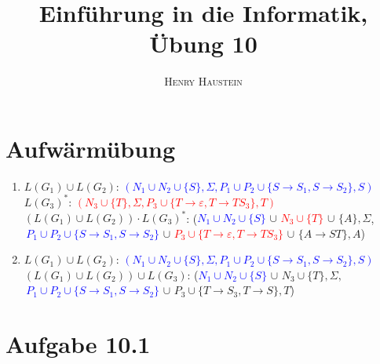 \documentclass{article}
\title{\textbf{Einführung in die Informatik, Übung 10}}
\author{\textsc{Henry Haustein}}
\date{}
\begin{document}
	\maketitle
	
	\section*{Aufwärmübung}
	\begin{enumerate}[label=(\alph*)]
		\item $L(G_1)\cup L(G_2)$: \textcolor{blue}{$(N_1\cup N_2\cup \{S\},\Sigma,P_1\cup P_2\cup \{S\to S_1,S\to S_2\},S)$} \\
		$L(G_3)^\ast$: \textcolor{red}{$(N_3\cup \{T\},\Sigma,P_3\cup \{T\to\varepsilon,T\to TS_3\},T)$} \\
		$(L(G_1)\cup L(G_2))\cdot L(G_3)^\ast$: (\textcolor{blue}{$N_1\cup N_2\cup \{S\}$} $\cup$ \textcolor{red}{$N_3\cup \{T\}$} $\cup \,\,\{A\},\Sigma$,\textcolor{blue}{$\,P_1\cup P_2\cup \{S\to S_1,S\to S_2\}$} $\cup$ \textcolor{red}{$P_3\cup \{T\to\varepsilon,T\to TS_3\}$} $\cup \,\,\{A\to ST\},A$)
		\item $L(G_1)\cup L(G_2)$: \textcolor{blue}{$(N_1\cup N_2\cup \{S\},\Sigma,P_1\cup P_2\cup \{S\to S_1,S\to S_2\},S)$} \\
		$(L(G_1)\cup L(G_2))\cup L(G_3)$: (\textcolor{blue}{$N_1\cup N_2\cup \{S\}$} $\cup \,\,N_3\cup \{T\},\Sigma,$\textcolor{blue}{$\,P_1\cup P_2\cup \{S\to S_1,S\to S_2\}$} $\cup \,\,P_3\cup \{T\to S_3,T\to S\},T$)
	\end{enumerate}
	
	\section*{Aufgabe 10.1}
	
\end{document}
